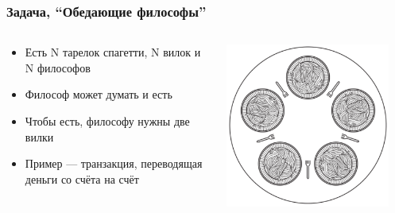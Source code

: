 \documentclass{../../slides-style}
\begin{document}
    \begin{frame}
        \frametitle{Задача, ``Обедающие философы''}
        \begin{columns}
            \begin{column}{0.5\textwidth}
                \begin{itemize}
                    \item Есть N тарелок спагетти, N вилок и N философов
                    \item Философ может думать и есть
                    \item Чтобы есть, философу нужны две вилки
                    \item Пример --- транзакция, переводящая деньги со счёта на счёт
                \end{itemize}
            \end{column}
            \begin{column}{0.5\textwidth}
                \includegraphics[width=0.9\textwidth]{diningPhilosophers.png}
            \end{column}
        \end{columns}
    \end{frame}
\end{document}
